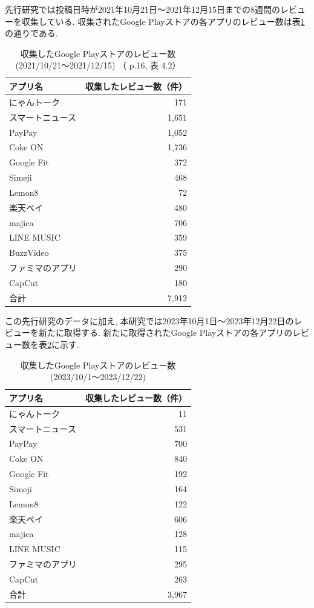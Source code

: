先行研究では投稿日時が2021年10月21日〜2021年12月15日までの8週間のレビューを収集している. 収集されたGoogle Playストアの各アプリのレビュー数は表\ref{tb:rawreviewnum}の通りである. 
\begin{table}[H]
  \caption{収集したGoogle Playストアのレビュー数 (2021/10/21〜2021/12/15) （ \cite{kawatsura} p.16, 表 4.2）}
  \label{tb:rawreviewnum}
  \begin{center}
  \begin{tabular}{l|r}
    \hline
    アプリ名&収集したレビュー数（件）\\\hline\hline
    にゃんトーク&171\\\hline
    スマートニュース&1,651\\\hline
    PayPay&1,052\\\hline
    Coke ON&1,736\\\hline
    Google Fit&372\\\hline
    Simeji&468\\\hline
    Lemon8&72\\\hline
    楽天ペイ&480\\\hline
    majica&706\\\hline
    LINE MUSIC&359\\\hline
    BuzzVideo&375\\\hline
    ファミマのアプリ&290\\\hline
    CapCut&180\\\hline\hline
    合計&7,912
  \end{tabular}\end{center}
\end{table}

\noindent
この先行研究のデータに加え, 本研究では2023年10月1日〜2023年12月22日のレビューを新たに取得する. 新たに取得されたGoogle Playストアの各アプリのレビュー数を表\ref{tb:rawreviewnum2023}に示す. 
\begin{table}[H]
  \caption{収集したGoogle Playストアのレビュー数 (2023/10/1〜2023/12/22) }
  \label{tb:rawreviewnum2023}
  \begin{center}
  \begin{tabular}{l|r}
    \hline
    アプリ名&収集したレビュー数（件）\\\hline\hline
    にゃんトーク&11\\\hline
    スマートニュース&531\\\hline
    PayPay&700\\\hline
    Coke ON&840\\\hline
    Google Fit&192\\\hline
    Simeji&164\\\hline
    Lemon8&122\\\hline
    楽天ペイ&606\\\hline
    majica&128\\\hline
    LINE MUSIC&115\\\hline
    ファミマのアプリ&295\\\hline
    CapCut&263\\\hline\hline
    合計&3,967
  \end{tabular}\end{center}
\end{table}

